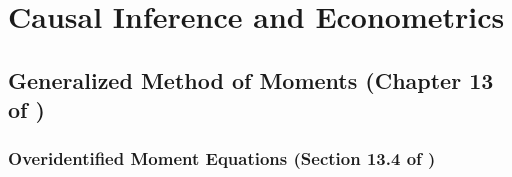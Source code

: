 %
%
%
%
%
%
%
%
%
%
%
%
%
%
%

\chapter{Causal Inference and Econometrics}






\section{Generalized Method of Moments (Chapter 13 of \citet{hansen2020})}

\subsection{Overidentified Moment Equations (Section 13.4 of \citet{hansen2020})}\label{sec.overid.gmm}

